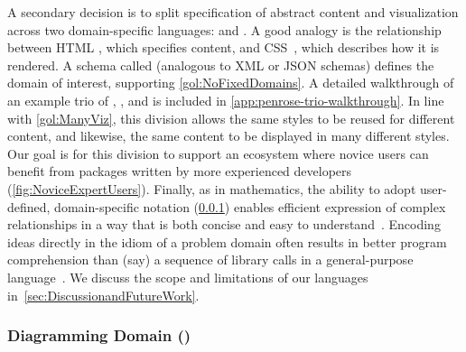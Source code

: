 A secondary decision is to split specification of abstract content and visualization across two domain-specific languages: \Substance{} and \Style{}.  A good analogy is the relationship between HTML \cite{BernersLee:1995:HML}, which specifies content, and CSS~\cite{Lie:2005:CSS}, which describes how it is rendered.  A schema called \Domain{} (analogous to XML or JSON schemas) defines the domain of interest, supporting \ref{gol:NoFixedDomains}. A detailed walkthrough of an example trio of \Domain{}, \Substance{}, and \Style{} is included in \cref{app:penrose-trio-walkthrough}.  In line with \ref{gol:ManyViz}, this division allows the same styles to be reused for different content, and likewise, the same content to be displayed in many different styles.  Our goal is for this division to support an ecosystem where novice users can benefit from packages written by more experienced developers (\cref{fig:NoviceExpertUsers}).  Finally, as in mathematics, the ability to adopt user-defined, domain-specific notation (\cref{sec:MathematicalDomain}) enables efficient expression of complex relationships in a way that is both concise and easy to understand~\cite{Kosar:2012:PCD}.  Encoding ideas directly in the idiom of a problem domain often results in better program comprehension than (say) a sequence of library calls in a general-purpose language~\cite{van_deursen_domain-specific_2000}.  We discuss the scope and limitations of our languages in~\cref{sec:DiscussionandFutureWork}.





\subsubsection{Diagramming Domain (\Domain{})}
\label{sec:MathematicalDomain}

